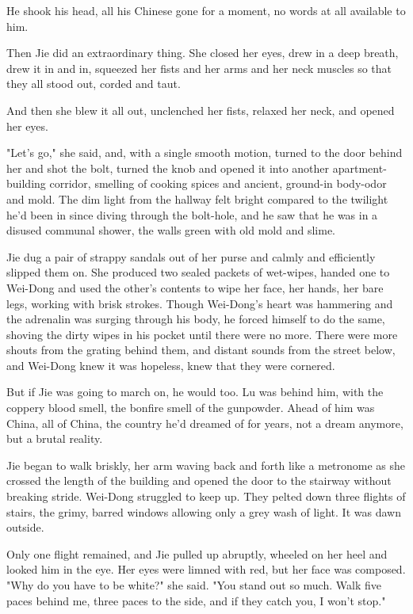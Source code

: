 He shook his head, all his Chinese gone for a moment, no words at
all available to him.

Then Jie did an extraordinary thing. She closed her eyes, drew in a
deep breath, drew it in and in, squeezed her fists and her arms and
her neck muscles so that they all stood out, corded and taut.

And then she blew it all out, unclenched her fists, relaxed her
neck, and opened her eyes.

"Let's go," she said, and, with a single smooth motion, turned to
the door behind her and shot the bolt, turned the knob and opened
it into another apartment-building corridor, smelling of cooking
spices and ancient, ground-in body-odor and mold. The dim light
from the hallway felt bright compared to the twilight he'd been in
since diving through the bolt-hole, and he saw that he was in a
disused communal shower, the walls green with old mold and slime.

Jie dug a pair of strappy sandals out of her purse and calmly and
efficiently slipped them on. She produced two sealed packets of
wet-wipes, handed one to Wei-Dong and used the other's contents to
wipe her face, her hands, her bare legs, working with brisk
strokes. Though Wei-Dong's heart was hammering and the adrenalin
was surging through his body, he forced himself to do the same,
shoving the dirty wipes in his pocket until there were no more.
There were more shouts from the grating behind them, and distant
sounds from the street below, and Wei-Dong knew it was hopeless,
knew that they were cornered.

But if Jie was going to march on, he would too. Lu was behind him,
with the coppery blood smell, the bonfire smell of the gunpowder.
Ahead of him was China, all of China, the country he'd dreamed of
for years, not a dream anymore, but a brutal reality.

Jie began to walk briskly, her arm waving back and forth like a
metronome as she crossed the length of the building and opened the
door to the stairway without breaking stride. Wei-Dong struggled to
keep up. They pelted down three flights of stairs, the grimy,
barred windows allowing only a grey wash of light. It was dawn
outside.

Only one flight remained, and Jie pulled up abruptly, wheeled on
her heel and looked him in the eye. Her eyes were limned with red,
but her face was composed. "Why do you have to be white?" she said.
"You stand out so much. Walk five paces behind me, three paces to
the side, and if they catch you, I won't stop."

